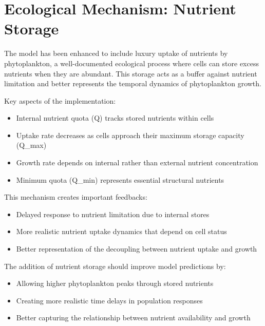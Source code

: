 \section{Ecological Mechanism: Nutrient Storage}

The model has been enhanced to include luxury uptake of nutrients by phytoplankton, a well-documented ecological process where cells can store excess nutrients when they are abundant. This storage acts as a buffer against nutrient limitation and better represents the temporal dynamics of phytoplankton growth.

Key aspects of the implementation:

\begin{itemize}
    \item Internal nutrient quota (Q) tracks stored nutrients within cells
    \item Uptake rate decreases as cells approach their maximum storage capacity (Q_max)
    \item Growth rate depends on internal rather than external nutrient concentration
    \item Minimum quota (Q_min) represents essential structural nutrients
\end{itemize}

This mechanism creates important feedbacks:
\begin{itemize}
    \item Delayed response to nutrient limitation due to internal stores
    \item More realistic nutrient uptake dynamics that depend on cell status
    \item Better representation of the decoupling between nutrient uptake and growth
\end{itemize}

The addition of nutrient storage should improve model predictions by:
\begin{itemize}
    \item Allowing higher phytoplankton peaks through stored nutrients
    \item Creating more realistic time delays in population responses
    \item Better capturing the relationship between nutrient availability and growth
\end{itemize}
